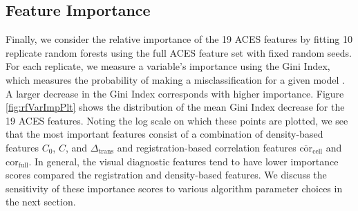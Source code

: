 \documentclass[11pt,]{isuthesis}
\begin{document}
\hypertarget{feature-importance}{%
\subsection{Feature Importance}\label{feature-importance}}

Finally, we consider the relative importance of the 19 ACES features by fitting 10 replicate random forests using the full ACES feature set with fixed random seeds.
For each replicate, we measure a variable's importance using the Gini Index, which measures the probability of making a misclassification for a given model \citep{hastie_elements_2008}.
A larger decrease in the Gini Index corresponds with higher importance.
Figure \ref{fig:rfVarImpPlt} shows the distribution of the mean Gini Index decrease for the 19 ACES features.
Noting the log scale on which these points are plotted, we see that the most important features consist of a combination of density-based features \(C_0\), \(C\), and \(\Delta_{\text{trans}}\) and registration-based correlation features \(\overline{\text{cor}}_{\text{cell}}\) and \(\text{cor}_{\text{full}}\).
In general, the visual diagnostic features tend to have lower importance scores compared the registration and density-based features.
We discuss the sensitivity of these importance scores to various algorithm parameter choices in the next section.
\end{document}
